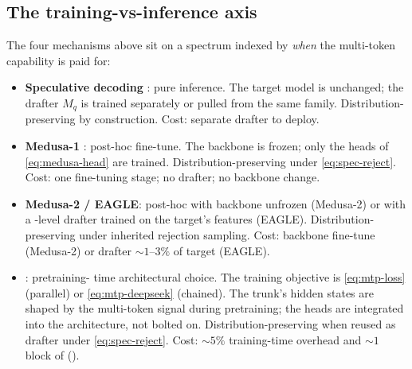\subsection{The training-vs-inference axis}
\label{sec:mt-axis}

The four mechanisms above sit on a spectrum indexed by \emph{when} the
multi-token capability is paid for:

\begin{itemize}
\item \textbf{Speculative decoding} \citep{leviathan2023}: pure
inference. The target model is unchanged; the drafter $M_q$ is trained
separately or pulled from the same family. Distribution-preserving by
construction. Cost: separate drafter to deploy.

\item \textbf{Medusa-1} \citep{cai2024-medusa}: post-hoc fine-tune.
The backbone is frozen; only the heads of \cref{eq:medusa-head} are
trained. Distribution-preserving under \cref{eq:spec-reject}. Cost:
one fine-tuning stage; no drafter; no backbone change.

\item \textbf{Medusa-2 / EAGLE}: post-hoc with backbone unfrozen
(Medusa-2) or with a -level drafter trained on the target's
features (EAGLE). Distribution-preserving under inherited rejection
sampling. Cost: backbone fine-tune (Medusa-2) or drafter 
$\sim 1\text{--}3\%$ of target (EAGLE).

\item \textbf{} \citep{gloeckle2024-mtp,deepseek-v3}: pretraining-
time architectural choice. The training objective is
\cref{eq:mtp-loss} (parallel) or \cref{eq:mtp-deepseek} (chained).
The trunk's hidden states are shaped by the multi-token signal during
pretraining; the heads are integrated into the architecture, not
bolted on. Distribution-preserving when reused as drafter under
\cref{eq:spec-reject}. Cost: $\sim 5\%$ training-time overhead and
$\sim 1$  block of  ().
\end{itemize}

